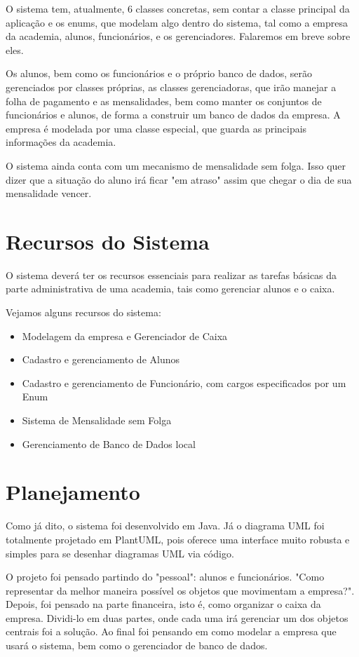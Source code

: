 \documentclass[12pt]{article}
\begin{document}
O sistema tem, atualmente, 6 classes concretas, sem contar a classe principal da aplicação e os enums, que modelam algo dentro do sistema, tal como a empresa da academia, alunos, funcionários, e os gerenciadores. Falaremos em breve sobre eles. 

Os alunos, bem como os funcionários e o próprio banco de dados, serão gerenciados por classes próprias, as classes gerenciadoras, que irão manejar a folha de pagamento e as mensalidades, bem como manter os conjuntos de funcionários e alunos, de forma a construir um banco de dados da empresa. A empresa é modelada por uma classe especial, que guarda as principais informações da academia. 

O sistema ainda conta com um mecanismo de mensalidade sem folga. Isso quer dizer que a situação do aluno irá ficar "em atraso" assim que chegar o dia de sua mensalidade vencer.

\section{Recursos do Sistema}

O sistema deverá ter os recursos essenciais para realizar as tarefas básicas da parte administrativa de uma academia, tais como gerenciar alunos e o caixa. 

Vejamos alguns recursos do sistema:

\begin{itemize}
    \item Modelagem da empresa e Gerenciador de Caixa
    \item Cadastro e gerenciamento de Alunos
    \item Cadastro e gerenciamento de Funcionário, com cargos especificados por um Enum
    \item Sistema de Mensalidade sem Folga
    \item Gerenciamento de Banco de Dados local
\end{itemize}

\section{Planejamento}

Como já dito, o sistema foi desenvolvido em Java. Já o diagrama UML foi totalmente projetado em PlantUML, pois oferece uma interface muito robusta e simples para se desenhar diagramas UML via código.

O projeto foi pensado partindo do "pessoal": alunos e funcionários. "Como representar da melhor maneira possível os objetos que movimentam a empresa?". Depois, foi pensado na parte financeira, isto é, como organizar o caixa da empresa. Dividi-lo em duas partes, onde cada uma irá gerenciar um dos objetos centrais foi a solução. Ao final foi pensando em como modelar a empresa que usará o sistema, bem como o gerenciador de banco de dados.
\end{document}
